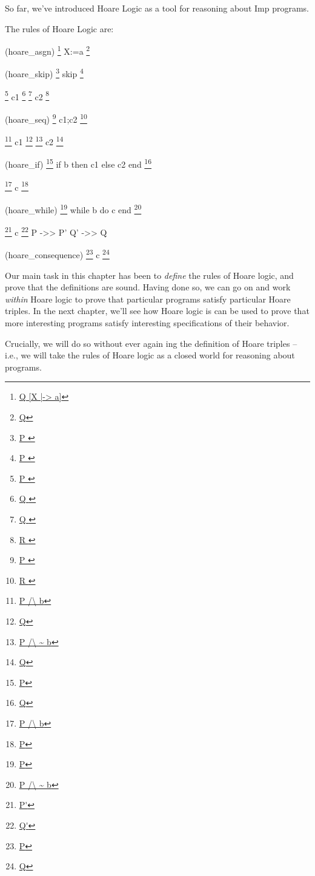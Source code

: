 \documentclass[12pt]{report}
\begin{document}
{{{{{{ So far, we've introduced Hoare Logic as a tool for reasoning about
    Imp programs.


    The rules of Hoare Logic are:
\par
\noindent\hrulefill\par
\noindent{} (hoare\_asgn)
             \footnote{\url{Q [X |-> a]}} X:=a \footnote{\url{Q}}
\par
\noindent\hrulefill\par
\noindent{}  (hoare\_skip)
             \footnote{\url{ P }} skip \footnote{\url{ P }}


               \footnote{\url{ P }} c1 \footnote{\url{ Q }}
               \footnote{\url{ Q }} c2 \footnote{\url{ R }}
\par
\noindent\hrulefill\par
\noindent{}  (hoare\_seq)
              \footnote{\url{ P }} c1;c2 \footnote{\url{ R }}


              \footnote{\url{P /\   b}} c1 \footnote{\url{Q}}
              \footnote{\url{P /\ ~ b}} c2 \footnote{\url{Q}}
\par
\noindent\hrulefill\par
\noindent{}  (hoare\_if)
      \footnote{\url{P}} if b then c1 else c2 end \footnote{\url{Q}}


               \footnote{\url{P /\ b}} c \footnote{\url{P}}
\par
\noindent\hrulefill\par
\noindent{}  (hoare\_while)
        \footnote{\url{P}} while b do c end \footnote{\url{P /\ ~ b}}


                \footnote{\url{P'}} c \footnote{\url{Q'}}
                   P ->> P'
                   Q' ->> Q
\par
\noindent\hrulefill\par
\noindent{}   (hoare\_consequence)
                \footnote{\url{P}} c \footnote{\url{Q}}


 Our main task in this chapter has been to \textit{define} the rules of
    Hoare logic, and prove that the definitions are sound.  Having
    done so, we can go on and work \textit{within} Hoare logic to prove that
    particular programs satisfy particular Hoare triples.  In the next
    chapter, we'll see how Hoare logic is can be used to prove that
    more interesting programs satisfy interesting specifications of
    their behavior.


    Crucially, we will do so without ever again ing the
    definition of Hoare triples -- i.e., we will take the rules of
    Hoare logic as a closed world for reasoning about programs. 
\begin{coqdoccode}
\coqdocemptyline
\end{coqdoccode}
}}}}}}
\end{document}
